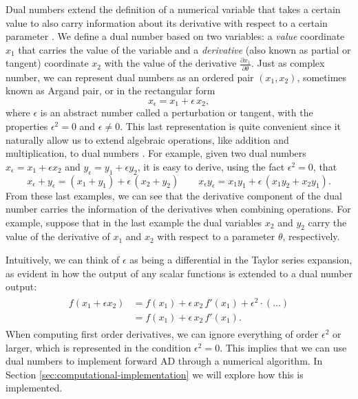 Dual numbers extend the definition of a numerical variable that takes a certain value to also carry information about its derivative with respect to a certain parameter \cite{clifford1871dualnumbers}. 
We define a dual number based on two variables: a \textit{value} coordinate $x_1$ that carries the value of the variable and a \textit{derivative} (also known as partial or tangent) coordinate $x_2$ with the value of the derivative $\frac{\partial x_1}{\partial \theta}$. 
Just as complex number, we can represent dual numbers as an ordered pair $(x_1, x_2)$, sometimes known as Argand pair, or in the rectangular form 
\begin{equation}
 x_\epsilon = x_1 + \epsilon \, x_2,
\end{equation}
where $\epsilon$ is an abstract number called a perturbation or tangent, with the properties $\epsilon^2 = 0$ and $\epsilon \neq 0$.
This last representation is quite convenient since it naturally allow us to extend algebraic operations, like addition and multiplication, to dual numbers \cite{Karczmarczuk2001}. 
For example, given two dual numbers $x_\epsilon = x_1 + \epsilon x_2$ and $y_\epsilon = y_1 + \epsilon y_2$, it is easy to derive, using the fact $\epsilon^2=0$, that
\begin{equation}
 x_\epsilon + y_\epsilon = (x_1 + y_1) + \epsilon \, (x_2 + y_2)
 \qquad
 x_\epsilon y_\epsilon = x_1 y_1 + \epsilon \, (x_1 y_2 + x_2 y_1) .
\end{equation}
From these last examples, we can see that the derivative component of the dual number carries the information of the derivatives when combining operations.
For example, suppose that in the last example the dual variables $x_2$ and $y_2$ carry the value of the derivative of $x_1$ and $x_2$ with respect to a parameter $\theta$, respectively. 

Intuitively, we can think of $\epsilon$ as being a differential in the Taylor series expansion, as evident in how the output of any scalar functions is extended to a dual number output:
\begin{align}
\begin{split}
    f(x_1 + \epsilon x_2)
    &= 
    f(x_1)
    + 
    \epsilon \, x_2 \,  f'(x_1)
    + 
    \epsilon^2 \cdot ( \ldots )\\
    &= 
    f(x_1)
    + 
    \epsilon \, x_2 \,  f'(x_1).
\end{split}
\label{eq:dual-number-function}
\end{align}
When computing first order derivatives, we can ignore everything of order $\epsilon^2$ or larger, which is represented in the condition $\epsilon^2 = 0$.
This implies that we can use dual numbers to implement forward AD through a numerical algorithm. 
In Section \ref{sec:computational-implementation} we will explore how this is implemented. 

